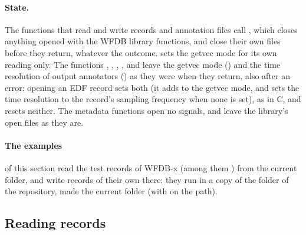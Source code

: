 \paragraph{State.} The functions that read and write records and annotation files call
, which closes anything opened with the WFDB library functions,
and close their own files before they return, whatever the outcome.
 sets the getvec mode for its own reading only. The functions
, , ,
,  and
 leave the getvec mode () and the time
resolution of output annotators () as they were when they return,
also after an error: opening an EDF record sets both (it adds  to the
getvec mode, and sets the time resolution to the record's sampling frequency when none is
set), as in C, and  resets neither. The metadata
functions open no signals, and leave the library's open files as they are.

\paragraph{The examples} of this section read the test records of WFDB-x (among them
) from the current folder, and write records of their own there: they run in a
copy of the folder  of the repository, made the current folder (with
 on the path).

\subsection{Reading records}
\label{sec:matlab-reading}

